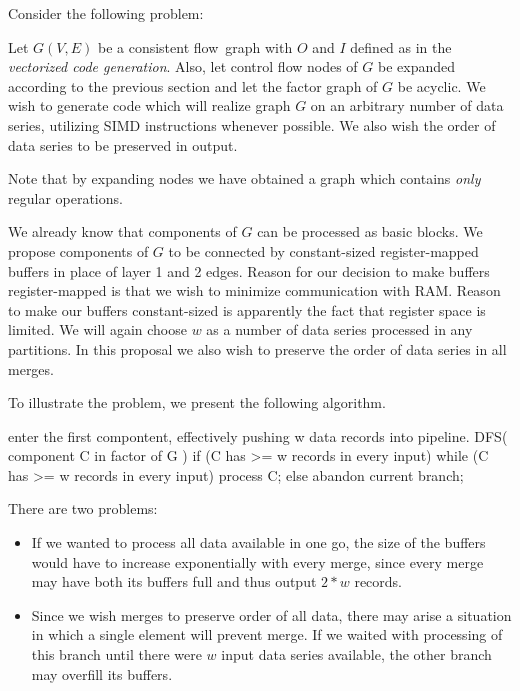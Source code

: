 Consider the following problem:

\begin{problem}
Let $G(V,E)$ be a consistent flow~graph with $O$ and $I$ defined as in the \emph{vectorized code generation}. Also, let control flow nodes of $G$ be expanded according to the previous section and let the factor graph of $G$ be acyclic. We wish to generate code which will realize graph $G$ on an arbitrary number of data series, utilizing SIMD instructions whenever possible. We also wish the order of data series to be preserved in output.
\end{problem}

\begin{rem} 
Note that by expanding nodes we have obtained a graph which contains \emph{only} regular operations.
\end{rem}

We already know that components of $G$ can be processed as basic blocks. We propose components of $G$ to be connected by constant-sized register-mapped buffers in place of layer 1 and 2 edges. Reason for our decision to make buffers register-mapped is that we wish to minimize communication with RAM. Reason to make our buffers constant-sized is apparently the fact that register space is limited. We will again choose $w$ as a number of data series processed in any partitions. In this proposal we also wish to preserve the order of data series in all merges.

\parspace

To illustrate the problem, we present the following algorithm.

\begin{code}
enter the first compontent, 
  effectively pushing w data records into pipeline.
DFS( component C in factor of G )
{
  if (C has >= w records in every input)
    while (C has >= w records in every input)
      process C;
  else
    abandon current branch;
}
\end{code}

There are two problems:

\begin{itemize}
  \item If we wanted to process all data available in one go, the size of the buffers would have to increase exponentially with every merge, since every merge may have both its buffers full and thus output $2*w$ records.
  \item Since we wish merges to preserve order of all data, there may arise a situation in which a single element will prevent merge. If we waited with processing of this branch until there were $w$ input data series available, the other branch may overfill its buffers.
\end{itemize}

